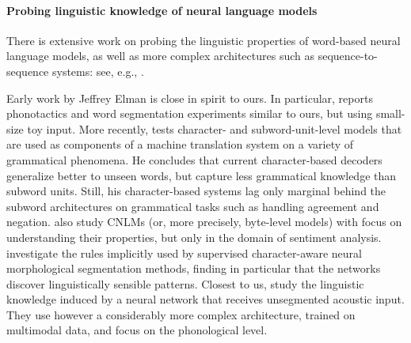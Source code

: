 \paragraph{Probing linguistic knowledge of neural language models} There is extensive work on probing the linguistic properties of
word-based neural language models, as well as more complex
architectures such as sequence-to-sequence systems: see, e.g.,
.

Early work by Jeffrey Elman is close in spirit to ours. In particular,
 reports phonotactics and word segmentation
experiments similar to ours, but using small-size toy input. More
recently,  tests character- and
subword-unit-level models that are used as components of a machine
translation system on a variety of grammatical phenomena. He concludes
that current character-based decoders generalize better to unseen
words, but capture less grammatical knowledge than subword
units. Still, his character-based systems lag only marginal behind the
subword architectures on grammatical tasks such as handling agreement
and negation.  also study CNLMs (or, more
precisely, byte-level models) with focus on understanding their
properties, but only in the domain of sentiment
analysis.  investigate the rules implicitly
used by supervised character-aware neural morphological segmentation
methods, finding in particular that the networks discover
linguistically sensible patterns. Closest to us,
 study the linguistic knowledge induced by a
neural network that receives unsegmented acoustic input. They use
however a considerably more complex architecture, trained on
multimodal data, and focus on the phonological level.



